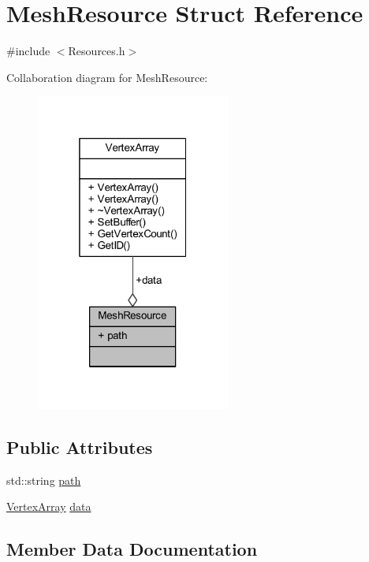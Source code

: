 \hypertarget{struct_mesh_resource}{}\section{Mesh\+Resource Struct Reference}
\label{struct_mesh_resource}


{\ttfamily \#include $<$Resources.\+h$>$}



Collaboration diagram for Mesh\+Resource\+:
\nopagebreak
\begin{figure}[H]
\begin{center}
\leavevmode
\includegraphics[width=181pt]{struct_mesh_resource__coll__graph}
\end{center}
\end{figure}
\subsection*{Public Attributes}
\begin{DoxyCompactItemize}
\item 
std\+::string \mbox{\hyperlink{struct_mesh_resource_a614a05a4784b5ab50bedbc676ff5b9a8}{path}}
\item 
\mbox{\hyperlink{class_vertex_array}{Vertex\+Array}} \mbox{\hyperlink{struct_mesh_resource_a755374f1f315a283e3bd1aa1d29d3a0a}{data}}
\end{DoxyCompactItemize}


\subsection{Member Data Documentation}
\mbox{\label{struct_mesh_resource_a755374f1f315a283e3bd1aa1d29d3a0a}} 

